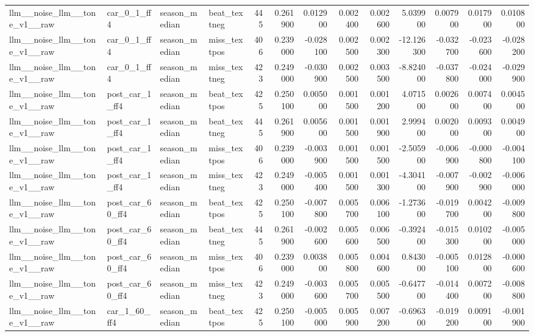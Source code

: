 \begin{table}
\begin{tabular}{llllrrrrrrrrr}
llm\_\_noise\_llm\_\_tone\_v1\_\_raw & car\_0\_1\_ff4 & season\_median & beat\_textneg & 445 & 0.261900 & 0.012900 & 0.002400 & 0.002600 & 5.039900 & 0.007900 & 0.017900 & 0.010800 \\
llm\_\_noise\_llm\_\_tone\_v1\_\_raw & car\_0\_1\_ff4 & season\_median & miss\_textpos & 406 & 0.239000 & -0.028100 & 0.002500 & 0.002300 & -12.126300 & -0.032700 & -0.023600 & -0.028200 \\
llm\_\_noise\_llm\_\_tone\_v1\_\_raw & car\_0\_1\_ff4 & season\_median & miss\_textneg & 423 & 0.249000 & -0.030900 & 0.002500 & 0.003500 & -8.824000 & -0.037800 & -0.024000 & -0.029900 \\
llm\_\_noise\_llm\_\_tone\_v1\_\_raw & post\_car\_1\_ff4 & season\_median & beat\_textpos & 425 & 0.250100 & 0.005000 & 0.001500 & 0.001200 & 4.071500 & 0.002600 & 0.007400 & 0.004500 \\
llm\_\_noise\_llm\_\_tone\_v1\_\_raw & post\_car\_1\_ff4 & season\_median & beat\_textneg & 445 & 0.261900 & 0.005600 & 0.001500 & 0.001900 & 2.999400 & 0.002000 & 0.009300 & 0.004900 \\
llm\_\_noise\_llm\_\_tone\_v1\_\_raw & post\_car\_1\_ff4 & season\_median & miss\_textpos & 406 & 0.239000 & -0.003900 & 0.001500 & 0.001500 & -2.505900 & -0.006900 & -0.000800 & -0.004100 \\
llm\_\_noise\_llm\_\_tone\_v1\_\_raw & post\_car\_1\_ff4 & season\_median & miss\_textneg & 423 & 0.249000 & -0.005400 & 0.001500 & 0.001300 & -4.304100 & -0.007900 & -0.002900 & -0.006000 \\
llm\_\_noise\_llm\_\_tone\_v1\_\_raw & post\_car\_60\_ff4 & season\_median & beat\_textpos & 425 & 0.250100 & -0.007800 & 0.005700 & 0.006100 & -1.273600 & -0.019700 & 0.004200 & -0.009800 \\
llm\_\_noise\_llm\_\_tone\_v1\_\_raw & post\_car\_60\_ff4 & season\_median & beat\_textneg & 445 & 0.261900 & -0.002600 & 0.005600 & 0.006500 & -0.392400 & -0.015300 & 0.010200 & -0.005000 \\
llm\_\_noise\_llm\_\_tone\_v1\_\_raw & post\_car\_60\_ff4 & season\_median & miss\_textpos & 406 & 0.239000 & 0.003800 & 0.005800 & 0.004600 & 0.843000 & -0.005100 & 0.012800 & -0.000600 \\
llm\_\_noise\_llm\_\_tone\_v1\_\_raw & post\_car\_60\_ff4 & season\_median & miss\_textneg & 423 & 0.249000 & -0.003600 & 0.005700 & 0.005500 & -0.647700 & -0.014400 & 0.007200 & -0.008800 \\
llm\_\_noise\_llm\_\_tone\_v1\_\_raw & car\_1\_60\_ff4 & season\_median & beat\_textpos & 425 & 0.250100 & -0.005000 & 0.005900 & 0.007200 & -0.696300 & -0.019200 & 0.009100 & -0.001900 \\

\end{tabular}
\end{table}

